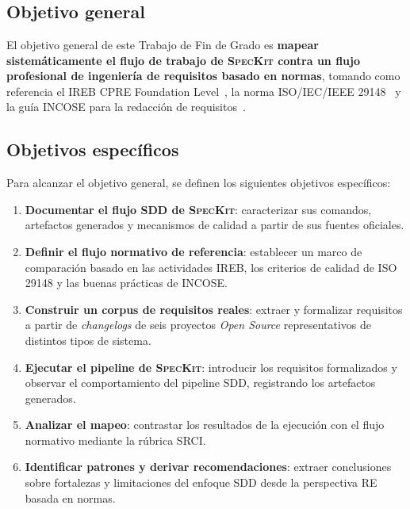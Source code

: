 \chapter{\objectivesname}
\label{chap:objetivos}

\section{Objetivo general}

El objetivo general de este Trabajo de Fin de Grado es \textbf{mapear sistem\'aticamente el flujo de trabajo de \textsc{SpecKit} contra un flujo profesional de ingenier\'ia de requisitos basado en normas}, tomando como referencia el IREB CPRE Foundation Level~\cite{cpre}, la norma ISO/IEC/IEEE 29148~\cite{iso29148} y la gu\'ia INCOSE para la redacci\'on de requisitos~\cite{incose}.

\section{Objetivos espec\'ificos}

Para alcanzar el objetivo general, se definen los siguientes objetivos espec\'ificos:

\begin{enumerate}
    \item \textbf{Documentar el flujo SDD de \textsc{SpecKit}}: caracterizar sus comandos, artefactos generados y mecanismos de calidad a partir de sus fuentes oficiales.

    \item \textbf{Definir el flujo normativo de referencia}: establecer un marco de comparaci\'on basado en las actividades IREB, los criterios de calidad de ISO 29148 y las buenas pr\'acticas de INCOSE.

    \item \textbf{Construir un corpus de requisitos reales}: extraer y formalizar requisitos a partir de \emph{changelogs} de seis proyectos \emph{Open Source} representativos de distintos tipos de sistema.

    \item \textbf{Ejecutar el pipeline de \textsc{SpecKit}}: introducir los requisitos formalizados y observar el comportamiento del pipeline SDD, registrando los artefactos generados.

    \item \textbf{Analizar el mapeo}: contrastar los resultados de la ejecuci\'on con el flujo normativo mediante la r\'ubrica SRCI.

    \item \textbf{Identificar patrones y derivar recomendaciones}: extraer conclusiones sobre fortalezas y limitaciones del enfoque SDD desde la perspectiva RE basada en normas.
\end{enumerate}